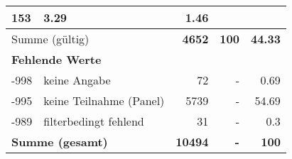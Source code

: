 \begin{longtable}{lXrrr}
       \num{153} &
       \num[round-mode=places,round-precision=2]{3,29} &
         \num[round-mode=places,round-precision=2]{1,46} \\
     \midrule
     \multicolumn{2}{l}{Summe (gültig)} &
       \textbf{\num{4652}} &
     \textbf{100} &
       \textbf{\num[round-mode=places,round-precision=2]{44,33}} \\
     \multicolumn{5}{l}{\textbf{Fehlende Werte}}\\
       -998 &
       keine Angabe &
         \num{72} &
        - &
         \num[round-mode=places,round-precision=2]{0,69} \\
       -995 &
       keine Teilnahme (Panel) &
         \num{5739} &
        - &
         \num[round-mode=places,round-precision=2]{54,69} \\
       -989 &
       filterbedingt fehlend &
         \num{31} &
        - &
         \num[round-mode=places,round-precision=2]{0,3} \\
     \midrule
     \multicolumn{2}{l}{\textbf{Summe (gesamt)}} &
          \textbf{\num{10494}} &
        \textbf{-} &
        \textbf{100} \\
     \bottomrule
     \end{longtable}
     
